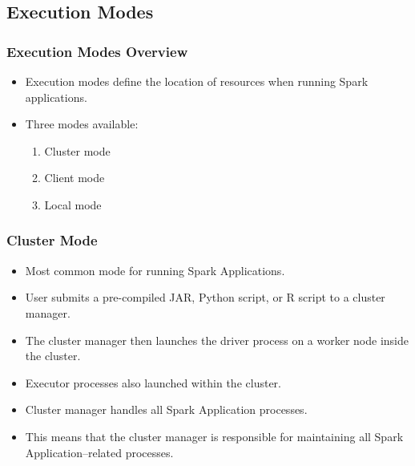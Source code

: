 \subsection{Execution Modes}\label{subsec:deployment-mode}
\begin{frame}
    \frametitle{Execution Modes Overview}
    \begin{itemize}
        \item Execution modes define the location of resources when running Spark applications.
        \item Three modes available:
        \begin{enumerate}
            \item Cluster mode
            \item Client mode
            \item Local mode
        \end{enumerate}
    \end{itemize}
\end{frame}

\begin{frame}
    \frametitle{Cluster Mode}
    \begin{itemize}
        \item Most common mode for running Spark Applications. \pause
        \item User submits a pre-compiled JAR, Python script, or R script to a cluster manager. \pause
        \item The cluster manager then launches the driver process on a worker node inside the cluster.\pause
        \item Executor processes also launched within the cluster.\pause
        \item Cluster manager handles all Spark Application processes.\pause
        \item This means that the cluster manager is responsible for maintaining all Spark Application–related processes.
    \end{itemize}
\end{frame}

